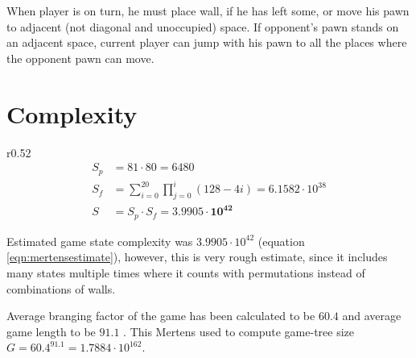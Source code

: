 When player is on turn, he must place wall, if he has left some, or move
his pawn to adjacent (not diagonal and unoccupied) space.
If opponent's pawn stands on an adjacent space, current player can jump
with his pawn to all the places where the opponent pawn can move.

\section{Complexity}
\begin{wrapfigure}{r}{0.52\textwidth}
  \vspace*{-2.35cm}
  \begin{equation}
    \label{eqn:mertensestimate}
    \begin{aligned}
      S_p\!&=\!81 \cdot 80 = 6480 \\
      S_f\!&=\!\sum_{i=0}^{20}\prod_{j=0}^{i}(128 - 4i)\!=\!6.1582{\cdot}10^{38} \\
      S\!&=\!S_p \cdot S_f = \mathbf{3.9905 \cdot 10 ^{42}}
    \end{aligned}
  \end{equation}
  \vspace*{-1.25cm}
\end{wrapfigure}

Estimated game state complexity was $3.9905\cdot10^{42}$
\cite{mertens} (equation \ref{eqn:mertensestimate}), however, this is very rough estimate, since
it includes many states multiple times where it counts with permutations
instead of combinations of walls.

Average branging factor of the game has been calculated to be $60.4$ and
average game length to be $91.1$ \cite{glendenning}. This Mertens used to
compute game-tree size $G = 60.4^{91.1} = 1.7884{\cdot}10^{162}$.

